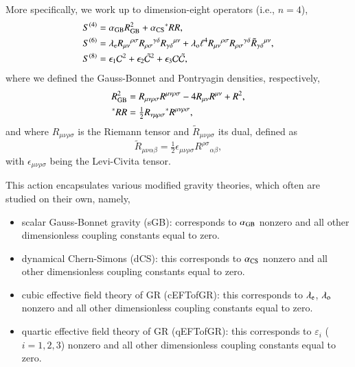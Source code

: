 \documentclass[twocolumn,prd,aps,superscriptaddress,preprintnumbers,tightenlines,showpacs,nofootinbib,eqsecnum,amsfonts,amsmath,longbibliography]{revtex4-2}
\newcommand{\lame}{\lambda_{\rm e}}
\newcommand{\lamo}{\lambda_{\rm o}}
\begin{document}
More specifically, we work up to dimension-eight operators (i.e., $n=4$),
%
\begin{subequations}
\begin{align}
S^{(4)} &= \alpha_{\rm GB} R^{2}_{\rm GB} + \alpha_{\rm CS} {}^{*}RR,
\label{eq:s_4}
\\
S^{(6)} &= \lame R_{\mu\nu}{}^{\rho\sigma} R_{\rho\sigma}{}^{\gamma\delta} R_{\gamma \delta}{}^{\mu\nu}
+ \lamo \ell^4 R_{\mu\nu}{}^{\rho\sigma} R_{\rho\sigma}{}^{\gamma\delta} \tilde{R}_{\gamma \delta}{}^{\mu\nu},
\label{eq:s_6}
\\
S^{(8)} &= \epsilon_{1} \mathcal{C}^2  + \epsilon_{2} \tilde{\mathcal{C}}^{2}
+ \epsilon_{3} \mathcal{C} \tilde{\mathcal{C}},
\label{eq:s_8}
\end{align}
\label{eq:action_mods}
\end{subequations}
%
where we defined the Gauss-Bonnet and Pontryagin densities, respectively,
%
\begin{subequations}
\begin{align}
    R^{2}_{\rm GB} &= R_{\mu\nu\rho\sigma}R^{\mu\nu\rho\sigma} - 4 R_{\mu\nu} R^{\mu\nu} + R^2,
    \\
    {}^{*}RR &= \tfrac{1}{2} R_{\nu\mu\rho\sigma} {}^{*}R^{\mu\nu\rho\sigma},
\end{align}
\end{subequations}
%
and where $R_{\mu\nu\rho\sigma}$ is the Riemann tensor
and $\tilde{R}_{\mu\nu\rho\sigma}$ its dual, defined as
%
\begin{equation}
\tilde{R}_{\mu\nu\alpha\beta} = \tfrac{1}{2} \epsilon_{\mu\nu\rho\sigma} R^{\rho\sigma}{}_{\alpha\beta},
\end{equation}
%
with $\epsilon_{\mu\nu\rho\sigma}$ being the Levi-Civita tensor.

This action encapsulates various modified gravity theories, which often are studied on their own,
namely,
%
\begin{itemize}
    \item scalar Gauss-Bonnet gravity (sGB): corresponds to $\alpha_{\rm GB}$
          nonzero and all other dimensionless coupling constants equal to zero.
    \item dynamical Chern-Simons (dCS): this corresponds to $\alpha_{\rm CS}$
          nonzero and all other dimensionless coupling constants equal to zero.
    \item cubic effective field theory of GR (cEFTofGR): this corresponds to $\lame$, $\lamo$ nonzero
          and all other dimensionless coupling constants equal to zero.
    \item quartic effective field theory of GR (qEFTofGR): this corresponds to $\varepsilon_{i}$
          ($i = 1,2,3$) nonzero and all other dimensionless coupling constants equal to zero.
\end{itemize}
\end{document}
